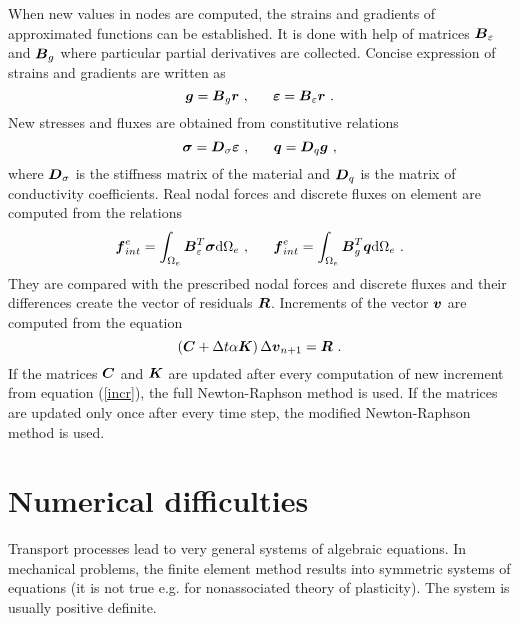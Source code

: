 When new values in nodes are computed, the strains and gradients of approximated functions can be established.
It is done with help of matrices $\mbox{\boldmath$B$}_{\varepsilon}$ and $\mbox{\boldmath$B$}_{g}$ where particular partial derivatives are collected.
Concise expression of strains and gradients are written as
\begin{equation}
\mbox{\boldmath$g$} = \mbox{\boldmath$B$}_{g} \mbox{\boldmath$r$}\ ,\ \ \ \ \
\mbox{\boldmath$\varepsilon$} = \mbox{\boldmath$B$}_{\varepsilon} \mbox{\boldmath$r$}\ .
\end{equation}
New stresses and fluxes are obtained from constitutive relations
\begin{equation}
\mbox{\boldmath$\sigma$} = \mbox{\boldmath$D$}_{\sigma} \mbox{\boldmath$\varepsilon$}\ ,\ \ \ \ \
\mbox{\boldmath$q$} = \mbox{\boldmath$D$}_{q} \mbox{\boldmath$g$}\ ,
\end{equation}
where $\mbox{\boldmath$D$}_{\sigma}$ is the stiffness matrix of the material and $\mbox{\boldmath$D$}_{q}$ is the matrix of conductivity
coefficients.
Real nodal forces and discrete fluxes on element are computed from the relations
\begin{equation}
\mbox{\boldmath$f$}_{int}^{e} = \int_{\Omega_e} \mbox{\boldmath$B$}^T_{\varepsilon} \mbox{\boldmath$\sigma$} {\rm d}\Omega_e\ ,\ \ \ \ \
\mbox{\boldmath$f$}_{int}^{e} = \int_{\Omega_e} \mbox{\boldmath$B$}^T_{g} \mbox{\boldmath$q$} {\rm d}\Omega_e\ .
\end{equation}
They are compared with the prescribed nodal forces and discrete fluxes and their differences create
the vector of residuals $\mbox{\boldmath$R$}$. Increments of the vector $\mbox{\boldmath$v$}$ are computed from the equation
\begin{equation}\label{incr}
\left(\mbox{\boldmath$C$} + \Delta t \alpha \mbox{\boldmath$K$}\right)\Delta \mbox{\boldmath$v$}_{n+1} = \mbox{\boldmath$R$}\ .
\end{equation}
If the matrices $\mbox{\boldmath$\mbox{\boldmath$C$}$}$ and $\mbox{\boldmath$\mbox{\boldmath$K$}$}$ are updated after every computation of new increment
from equation (\ref{incr}), the full Newton-Raphson method is used. If the matrices are updated only once
after every time step, the modified Newton-Raphson method is used.

\section{Numerical difficulties}

Transport processes lead to very general systems of algebraic equations. In mechanical
problems, the finite element method results into symmetric systems of equations (it is not
true e.g. for nonassociated theory of plasticity). The system is usually positive definite.

